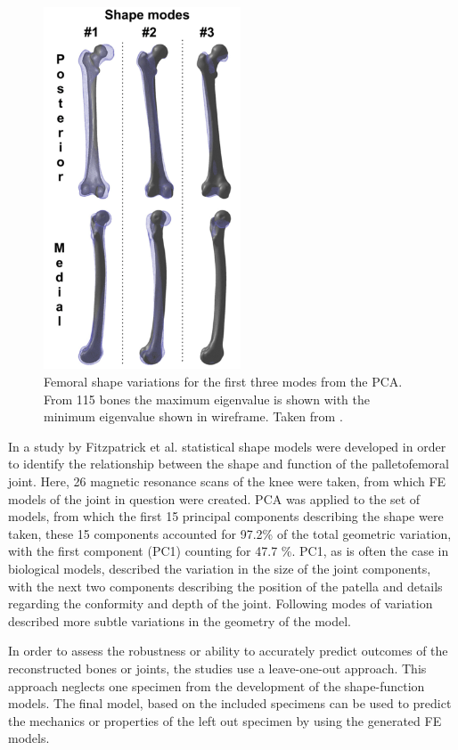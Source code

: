 \begin{figure}[hbt]

\centering
  \includegraphics[width=2.30233in,height=4.23373in]{images/femurShape.png}
  \caption{Femoral shape
variations for the first three modes from the PCA. From 115 bones the
maximum eigenvalue is shown with the minimum eigenvalue shown in
wireframe. Taken from \cite{Grassi2014}.}
\label{fig:femur}
\end{figure}


In a study by Fitzpatrick et al. \cite{Fitzpatrick2011} statistical shape
models were
developed in order to identify the relationship between the shape and
function of the palletofemoral joint. Here, 26 magnetic resonance scans
of the knee were taken, from which FE models of the joint in question
were created. PCA was applied to the set of models, from which the first
15 principal components describing the shape were taken, these 15
components accounted for 97.2\% of the total geometric variation, with
the first component (PC1) counting for 47.7 \%. PC1, as is often the
case in biological models, described the variation in the size of the
joint components, with the next two components describing the position
of the patella and details regarding the conformity and depth of the
joint. Following modes of variation described more subtle variations in
the geometry of the model.

In order to assess the robustness or ability to accurately predict
outcomes of the reconstructed bones or joints, the studies
\cite{Grassi2014,Fitzpatrick2011} use a leave-one-out approach. This
approach
neglects one specimen from the development of the shape-function models.
The final model, based on the included specimens can be used to predict
the mechanics or properties of the left out specimen by using the
generated FE models.

